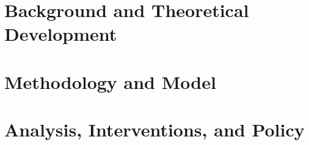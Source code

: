 

\part{Background and Theoretical Development} \label{part-background}





\part{Methodology and Model} \label{part-model}



\part{Analysis, Interventions, and Policy} \label{part-analysis}


